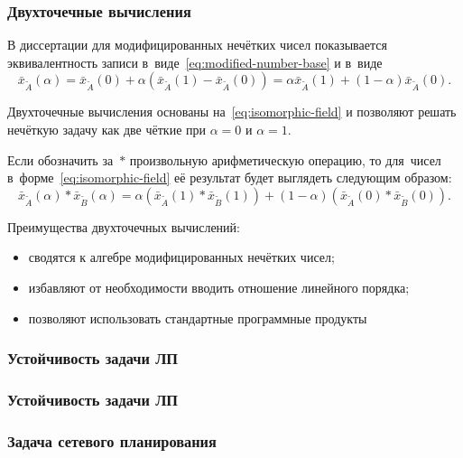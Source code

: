 \documentclass[12pt]{beamer}
\begin{document}
\begin{frame}
  \frametitle{Двухточечные вычисления}
  В диссертации для модифицированных нечётких чисел показывается эквивалентность записи в~виде~\eqref{eq:modified-number-base} и в~виде
\begin{equation}
\label{eq:isomorphic-field}
  \bar{x}_{\tilde A}\left( \alpha \right)=\bar{x}_{\tilde A}\left( 0 \right)+\alpha \left(\bar{x}_{\tilde A}\left( 1 \right)-\bar{x}_{\tilde A}\left(0 \right) \right)=\alpha \bar{x}_{\tilde A}\left( 1 \right)+\left( 1-\alpha  \right) \bar{x}_{\tilde A}\left( 0 \right).
\end{equation}

Двухточечные вычисления основаны на~\eqref{eq:isomorphic-field} и позволяют решать нечёткую задачу как две чёткие при $\alpha=0$ и $\alpha=1$. 

Если обозначить за~$*$ произвольную арифметическую операцию, то для~чисел в~форме~\eqref{eq:isomorphic-field} её результат будет выглядеть следующим образом:
\begin{equation}
\label{eq:two-point-calculations}
  \bar{x}_{\tilde A}\left( \alpha \right)*\bar{x}_{\tilde B}\left(\alpha \right)=\alpha \left(\bar{x}_{\tilde A}\left( 1 \right)*\bar{x}_{\tilde B}\left(1 \right) \right)+\left(1-\alpha \right)\left(\bar{x}_{\tilde A}\left(0 \right)*\bar{x}_{\tilde B}\left(0 \right) \right).
\end{equation}

Преимущества двухточечных вычислений:
\begin{itemize}
  \item сводятся к алгебре модифицированных нечётких чисел;
  \item избавляют от необходимости вводить отношение линейного порядка;
  \item позволяют использовать стандартные программные продукты
\end{itemize}


\end{frame}

\begin{frame}
  \frametitle{Устойчивость задачи ЛП}
\end{frame}

\begin{frame}
  \frametitle{Устойчивость задачи ЛП}
\end{frame}

\begin{frame}
  \frametitle{Задача сетевого планирования}
\end{frame}
\end{document}
